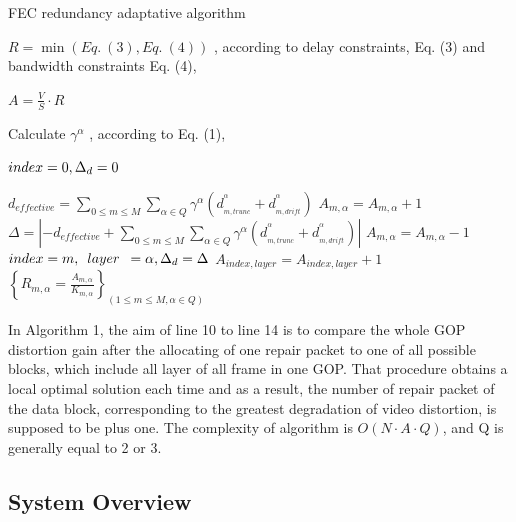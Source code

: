 \begin{algorithm}[!h] 
	\scriptsize
	\centering 
	\caption{FEC redundancy adaptative algorithm}%
	\begin{algorithmic}[1]%
		\STATE $R = \min (Eq.~(3), Eq.~(4))$ , according to delay constraints, Eq. (3) and
		bandwidth constraints Eq. (4),
		
		\STATE $A = \frac{V}{S} \cdot R$ 
		
		
		\STATE Calculate $\gamma ^\alpha$ , according to Eq. (1),
		
		\ENDFOR		
		
		\STATE $index{\rm{ }} = {\rm{ }}0,{\rm{ }}{\Delta _d}{\rm{ }} = 0$
		
		\STATE ${d_{effective}} = \sum\limits_{0 \le m \le M} {\sum\limits_{\alpha 
				\in Q} {{\gamma ^\alpha }(d_{_{m,trunc}}^{^\alpha } + d_{_{m,drift}}^{^\alpha
				})} } $
		\STATE ${A_{m,\alpha }} = {A_{m,\alpha }} + 1$
		\STATE $\Delta  = \left| { - {d_{effective}} + \sum\limits_{0 \le m \le M}
			{\sum\limits_{\alpha  \in Q} {{\gamma ^\alpha }(d_{_{m,trunc}}^{^\alpha } +
					d_{_{m,drift}}^{^\alpha })} } } \right|$
		\STATE ${A_{m,\alpha }} = {A_{m,\alpha }} - 1$
		\STATE $index{\rm{ }} = m,\begin{array}{*{20}{c}}
		{layer}
		\end{array} = \alpha ,{\Delta _d} = \Delta$
		\ENDIF
		\ENDFOR 
		\ENDFOR
		\STATE ${A_{index, layer }} = {A_{index, layer }} + 1$
		\ENDFOR
		\RETURN ${\left\{ {{R_{m,\alpha }} = \frac{{{A_{m,\alpha }}}}{{{K_{m,\alpha }}}}} \right\}_{(1 \le m \le M,\alpha  \in Q)}}$
	\end{algorithmic}  
\end{algorithm} 

In Algorithm 1, the aim of line 10 to line 14 is to compare the whole GOP distortion gain after the allocating of one repair packet to one of all possible blocks, which include all layer of all frame in one GOP.  That procedure obtains a local optimal solution each time and as a result, the number of repair packet of the data block, corresponding to the greatest degradation of video distortion, is supposed to be plus one. The complexity of algorithm is $O(N \cdot A \cdot Q)$, and Q is generally equal to 2 or 3.


\subsection{System Overview}

